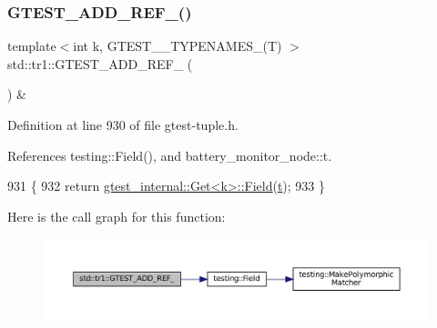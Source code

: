 \mbox{\label{namespacestd_1_1tr1_a495d7fb7a131317a9ba985598d3c1504}} 
\subsubsection{\texorpdfstring{G\+T\+E\+S\+T\+\_\+\+A\+D\+D\+\_\+\+R\+E\+F\+\_\+()}{GTEST\_ADD\_REF\_()}}
{\footnotesize\ttfamily template$<$int k, G\+T\+E\+S\+T\+\_\+\_\+\+T\+Y\+P\+E\+N\+A\+M\+E\+S\+\_\+(\+T) $>$ \\
std\+::tr1\+::\+G\+T\+E\+S\+T\+\_\+\+A\+D\+D\+\_\+\+R\+E\+F\+\_\+ (\begin{DoxyParamCaption}\item[{\hyperlink{gtest-tuple_8h_a1b7f133d8aa02e0b7afed7b66781eeb7}{G\+T\+E\+S\+T\+\_\+\+T\+U\+P\+L\+E\+\_\+\+E\+L\+E\+M\+E\+N\+T\+\_\+}(k, \hyperlink{namespacestd_1_1tr1_aa636d3269bf1f368a7bc09ff158bc482}{G\+T\+E\+S\+T\+\_\+10\+\_\+\+T\+U\+P\+L\+E\+\_\+}(T))}]{ }\end{DoxyParamCaption}) \&}



Definition at line 930 of file gtest-\/tuple.\+h.



References testing\+::\+Field(), and battery\+\_\+monitor\+\_\+node\+::t.


\begin{DoxyCode}
931                            \{
932   \textcolor{keywordflow}{return} \hyperlink{namespacetesting_a4df3849391696aa93ac3a7703a717c2a}{gtest\_internal::Get<k>::Field}(\hyperlink{namespacebattery__monitor__node_a7a63d20d1ea461e280f4eb5b47f925cd}{t});
933 \}
\end{DoxyCode}
Here is the call graph for this function\+:
\nopagebreak
\begin{figure}[H]
\begin{center}
\leavevmode
\includegraphics[width=350pt]{namespacestd_1_1tr1_a495d7fb7a131317a9ba985598d3c1504_cgraph}
\end{center}
\end{figure}
\mbox{\label{namespacestd_1_1tr1_ae7b5ea477ac34a3eef5c4c15c42b76ed}} 
